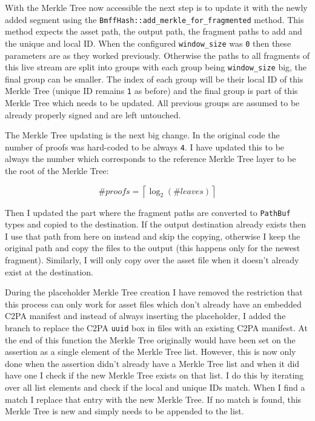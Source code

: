With the Merkle Tree now accessible the next step is to update it with the newly added segment using the \texttt{BmffHash::add\_merkle\_for\_fragmented} method. This method expects the asset path, the output path, the fragment paths to add and the unique and local ID. When the configured \texttt{window\_size} was \texttt{0} then these parameters are as they worked previously. Otherwise the paths to all fragments of this live stream are split into groups with each group being \texttt{window\_size} big, the final group can be smaller. The index of each group will be their local ID of this Merkle Tree (unique ID remains \texttt{1} as before) and the final group is part of this Merkle Tree which needs to be updated. All previous groups are assumed to be already properly signed and are left untouched.

The Merkle Tree updating is the next big change. In the original code the number of proofs was hard-coded to be always \texttt{4}. I have updated this to be always the number which corresponds to the reference Merkle Tree layer to be the root of the Merkle Tree:

\begin{equation}
    \#proofs = \left\lceil \log_2({\#leaves}) \right\rceil
    \label{eq:proofs}
\end{equation}

Then I updated the part where the fragment paths are converted to \texttt{PathBuf} types and copied to the destination. If the output destination already exists then I use that path from here on instead and skip the copying, otherwise I keep the original path and copy the files to the output (this happens only for the newest fragment). Similarly, I will only copy over the asset file when it doesn't already exist at the destination.

During the placeholder Merkle Tree creation I have removed the restriction that this process can only work for asset files which don't already have an embedded C2PA manifest and instead of always inserting the placeholder, I added the branch to replace the C2PA \texttt{uuid} box in files with an existing C2PA manifest. At the end of this function the Merkle Tree originally would have been set on the assertion as a single element of the Merkle Tree list. However, this is now only done when the assertion didn't already have a Merkle Tree list and when it did have one I check if the new Merkle Tree exists on that list. I do this by iterating over all list elements and check if the local and unique IDs match. When I find a match I replace that entry with the new Merkle Tree. If no match is found, this Merkle Tree is new and simply needs to be appended to the list.

